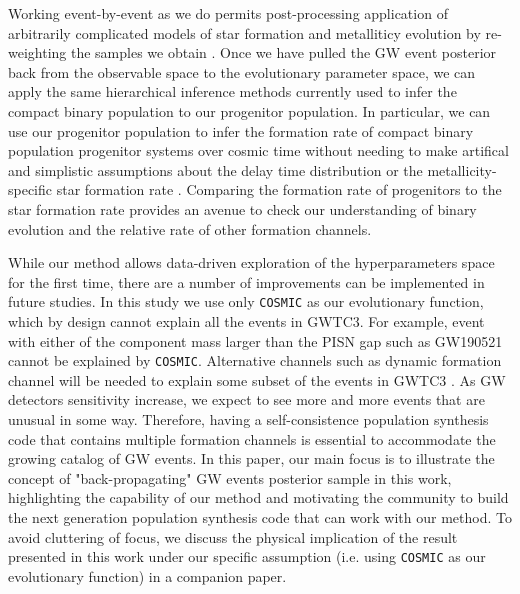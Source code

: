 \documentclass[twocolumn]{aastex631}
\begin{document}
Working event-by-event as we do permits post-processing application of
arbitrarily complicated models of star formation and metalliticy evolution by
re-weighting the samples we obtain \citep[e.g.][]{VanSon2022}. Once we have
pulled the GW event posterior back from the observable space to the evolutionary
parameter space, we can apply the same hierarchical inference methods currently
used to infer the compact binary population to our progenitor population.  In
particular, we can use our progenitor population to infer the formation rate of
compact binary population progenitor systems over cosmic time without needing to
make artifical and simplistic assumptions about the delay time distribution or
the metallicity-specific star formation rate
\citep{Vitale2019,Ng2021,VanSon2022}.  Comparing the formation rate of
progenitors to the star formation rate provides an avenue to check our
understanding of binary evolution and the relative rate of other formation
channels.

While our method allows data-driven exploration of the hyperparameters space for the first time, there are a number of improvements can be implemented in future studies.
In this study we use only \texttt{COSMIC} as our evolutionary function, which by design cannot explain all the events in GWTC3.
For example, event with either of the component mass larger than the PISN gap such as GW190521 cannot be explained by \texttt{COSMIC}.
Alternative channels such as dynamic formation channel will be needed to explain some subset of the events in GWTC3 \citep{Zevin2021}.
As GW detectors sensitivity increase, we expect to see more and more events that are unusual in some way.
Therefore, having a self-consistence population synthesis code that contains multiple formation channels is essential to accommodate the growing catalog of GW events.
In this paper, our main focus is to illustrate the concept of "back-propagating" GW events posterior sample in this work,
highlighting the capability of our method and motivating the community to build the next generation population synthesis code that can work with our method.
To avoid cluttering of focus, we discuss the physical implication of the result presented in this work under our specific assumption (i.e. using \texttt{COSMIC} as our evolutionary function) in a companion paper.
\end{document}
